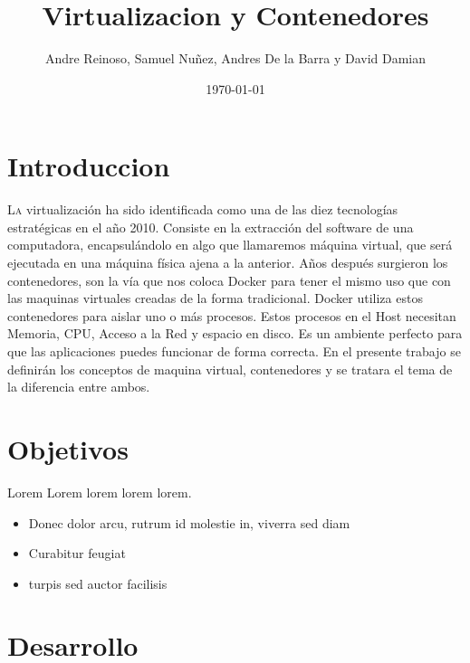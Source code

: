 \documentclass[twoside,twocolumn]{article}
\title{Virtualizacion y Contenedores} %
\author{Andre Reinoso, Samuel Nuñez, Andres De la Barra y David Damian}
\date{\today} %
\begin{document}
\maketitle


\section{Introduccion}

\lettrine[nindent=0em,lines=3]{L}a virtualización ha sido identificada como una de las diez tecnologías estratégicas en el año 2010. Consiste en la extracción del software de una computadora, encapsulándolo en algo que llamaremos máquina virtual, que será ejecutada en una máquina física ajena a la anterior.
Años después surgieron los contenedores, son la vía que nos coloca Docker para tener el mismo uso que con las maquinas virtuales creadas de la forma tradicional. Docker utiliza estos contenedores para aislar uno o más procesos. Estos procesos en el Host necesitan Memoria, CPU, Acceso a la Red y espacio en disco. Es un ambiente perfecto para que las aplicaciones puedes funcionar de forma correcta.
En el presente trabajo se definirán los conceptos de maquina virtual, contenedores y se tratara el tema de la diferencia entre ambos.




\section{Objetivos}

Lorem Lorem lorem lorem lorem. 
\begin{itemize}
\item Donec dolor arcu, rutrum id molestie in, viverra sed diam
\item Curabitur feugiat
\item turpis sed auctor facilisis

\end{itemize}





\section{Desarrollo}
\end{document}
